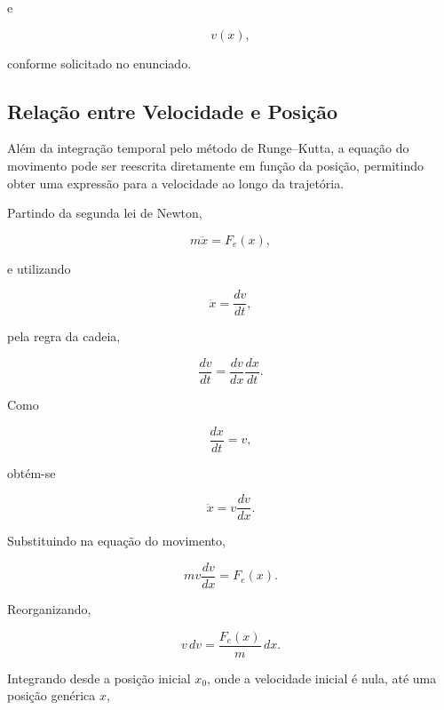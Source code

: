 \documentclass[12pt,a4paper]{article}
\begin{document}
e

\begin{equation}
v(x),
\end{equation}

conforme solicitado no enunciado.

\subsection{Relação entre Velocidade e Posição}

Além da integração temporal pelo método de Runge--Kutta, a equação do movimento
pode ser reescrita diretamente em função da posição, permitindo obter uma
expressão para a velocidade ao longo da trajetória.

Partindo da segunda lei de Newton,

\begin{equation}
m\ddot{x}
=
F_e(x),
\end{equation}

e utilizando

\begin{equation}
\ddot{x}
=
\frac{dv}{dt},
\end{equation}

pela regra da cadeia,

\begin{equation}
\frac{dv}{dt}
=
\frac{dv}{dx}
\frac{dx}{dt}.
\end{equation}

Como

\begin{equation}
\frac{dx}{dt}
=
v,
\end{equation}

obtém-se

\begin{equation}
\ddot{x}
=
v\frac{dv}{dx}.
\end{equation}

Substituindo na equação do movimento,

\begin{equation}
m
v
\frac{dv}{dx}
=
F_e(x).
\end{equation}

Reorganizando,

\begin{equation}
v\,dv
=
\frac{F_e(x)}{m}\,dx.
\end{equation}

Integrando desde a posição inicial $x_0$, onde a velocidade inicial é nula,
até uma posição genérica $x$,
\end{document}
